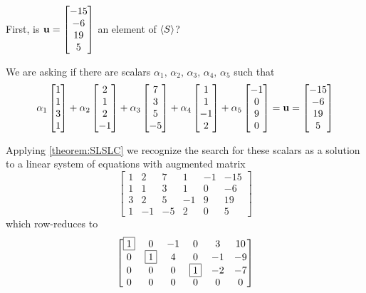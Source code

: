 \documentclass{ximera}
\begin{document}
\begin{example}
  \begin{question}
    First, is $\mathbf{u}=\begin{bmatrix}-15\\-6\\19\\5\end{bmatrix}$ an element of
    $\left\langle S\right\rangle$?
    
    \begin{multipleChoice}
    \end{multipleChoice}
    
    \begin{feedback}[correct]
      We are asking if there are scalars
      $\alpha_1,\,\alpha_2,\,\alpha_3,\,\alpha_4,\,\alpha_5$ such that
      \[
        \alpha_1\begin{bmatrix}1 \\ 1 \\ 3 \\ 1\end{bmatrix}+
        \alpha_2\begin{bmatrix}2 \\ 1 \\ 2 \\ -1\end{bmatrix}+
        \alpha_3\begin{bmatrix}7 \\ 3 \\ 5 \\ -5\end{bmatrix}+
        \alpha_4\begin{bmatrix}1 \\ 1 \\ -1 \\ 2\end{bmatrix}+
        \alpha_5\begin{bmatrix}-1 \\ 0 \\ 9 \\ 0\end{bmatrix}
        =\mathbf{u}
        =\begin{bmatrix}-15\\-6\\19\\5\end{bmatrix}
      \]
      
      Applying \ref{theorem:SLSLC} we recognize the search for these scalars
      as a solution to a linear system of equations with augmented matrix
      \[
        \begin{bmatrix}
          1 & 2 & 7 & 1 & -1 & -15 \\
          1 & 1 & 3 & 1 & 0 & -6 \\
          3 & 2 & 5 & -1 & 9 & 19 \\
          1 & -1 & -5 & 2 & 0 & 5
        \end{bmatrix}
      \]
      which row-reduces to
      \[
        \begin{bmatrix}
          \fbox{1} & 0 & -1 & 0 & 3 & 10 \\
          0 & \fbox{1} & 4 & 0 & -1 & -9 \\
          0 & 0 & 0 & \fbox{1} & -2 & -7 \\
          0 & 0 & 0 & 0 & 0 & 0
        \end{bmatrix}
      \]
      

\end{feedback}
\end{question}
\end{example}
\end{document}
